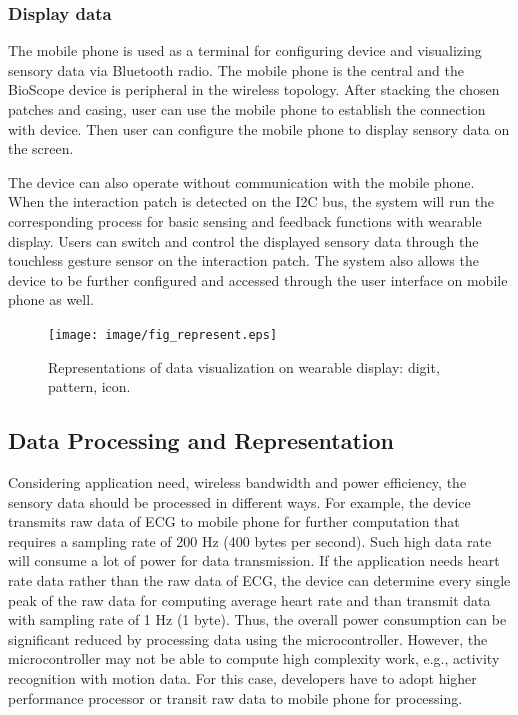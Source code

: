 \subsubsection{Display data}
The mobile phone is used as a terminal for configuring device and visualizing sensory data via Bluetooth radio.
The mobile phone is the central and the BioScope device is peripheral in the wireless topology.
After stacking the chosen patches and casing, user can use the mobile phone to establish the connection with device.
Then user can configure the mobile phone to display sensory data on the screen.

The device can also operate without communication with the mobile phone.
When the interaction patch is detected on the I2C bus, the system will run the corresponding process for basic sensing and feedback functions with wearable display.
Users can switch and control the displayed sensory data through the touchless gesture sensor on the interaction patch.
The system also allows the device to be further configured and accessed through the user interface on mobile phone as well.

\begin{figure}
\centering
\texttt{[image: image/fig\_represent.eps]}
\caption{Representations of data visualization on wearable display: digit, pattern, icon.}
\label{fig_represent}
\end{figure}

\subsection{Data Processing and Representation}
Considering application need, wireless bandwidth and power efficiency, the sensory data should be processed in different ways.
For example, the device transmits raw data of ECG to mobile phone for further computation that requires a sampling rate of 200 Hz (400 bytes per second). 
Such high data rate will consume a lot of power for data transmission.
If the application needs heart rate data rather than the raw data of ECG, the device can determine every single peak of the raw data for computing average heart rate and than transmit data with sampling rate of 1 Hz (1 byte).
Thus, the overall power consumption can be significant reduced by processing data using the microcontroller.
However, the microcontroller may not be able to compute high complexity work, e.g., activity recognition with motion data.
For this case, developers have to adopt higher performance processor or transit raw data to mobile phone for processing.


